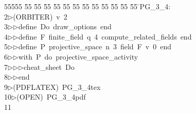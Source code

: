 %
%
\begin{tabbing}
55555 \= 55 \= 55 \= 55 \= 55 \= 55 \= 55 \= 55 \= 55 \= 55 \= 55 \= 55 \= 55 \= \>PG\_3\_4:\\[0pt]
2\>$\triangleright$\>(ORBITER)\ v\ 2\ \\[0pt]
3\>$\triangleright$\>$\triangleright$\>define\ Do\ draw\_options\ end\ \\[0pt]
4\>$\triangleright$\>$\triangleright$\>define\ F\ finite\_field\ q\ 4\ compute\_related\_fields\ end\ \\[0pt]
5\>$\triangleright$\>$\triangleright$\>define\ P\ projective\_space\ n\ 3\ field\ F\ v\ 0\ end\ \\[0pt]
6\>$\triangleright$\>$\triangleright$\>with\ P\ do\ projective\_space\_activity\ \\[0pt]
7\>$\triangleright$\>$\triangleright$\>$\triangleright$\>cheat\_sheet\ Do\ \\[0pt]
8\>$\triangleright$\>$\triangleright$\>end\\[0pt]
9\>$\triangleright$\>(PDFLATEX)\ PG\_3\_4tex\ \\[0pt]
10\>$\triangleright$\>(OPEN)\ PG\_3\_4pdf\\[0pt]
11\>\end{tabbing}
